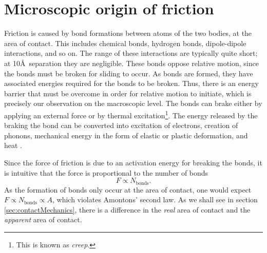 \documentclass[twoside,english]{uiofysmaster}
\begin{document}
\section{Microscopic origin of friction}
Friction is caused by bond formations between atoms of the two bodies, at the area of contact. 
This includes chemical bonds, hydrogen bonds, dipole-dipole interactions, and so on.  
The range of these interactions are typically quite short; at 10\AA ~separation they are negligible.
These bonds oppose relative motion, since the bonds must be broken for sliding to occur.
As bonds are formed, they have associated energies required for the bonds to be broken. 
Thus, there is an energy barrier that must be overcome in order for relative motion to initiate,
which is precisely our observation on the macroscopic level. 
The bonds can brake either by applying an external force or by thermal excitation\footnote{This is known as \textit{creep}.}.
The energy released by the braking the bond can be converted into excitation of electrons, creation of phonons, mechanical energy in the form of elastic or plastic deformation, and heat \cite{Introduction2Friction}.

Since the force of friction is due to an activation energy for breaking the bonds, it is intuitive that the force is proportional to the number of bonds
\begin{equation}
F \propto N_{\text{bonds}}.
\end{equation} 
As the formation of bonds only occur at the area of contact, one would expect $F\propto N_\text{bonds}\propto A$, which violates Amontons' second law. 
As we shall see in section \ref{sec:contactMechanics}, there is a difference in the \textit{real} area of contact and the \textit{apparent} area of contact.

%		
\end{document}
